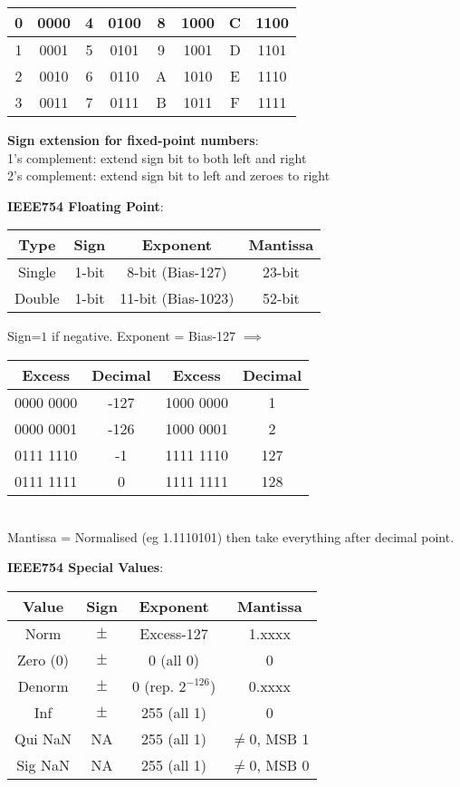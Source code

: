 \documentclass[a4paper,landscape]{article}
\newcommand{\rnname}[1]{\textbf{#1}}
\begin{document}
\begin{multicols*}{4}
\begin{flatitemize}
\begin{tabular}{|c|c|c|c|c|c|c|c|}
0 & 0000 & 4 & 0100 & 8 & 1000 & C & 1100 \\ \hline
1 & 0001 & 5 & 0101 & 9 & 1001 & D & 1101 \\ \hline
2 & 0010 & 6 & 0110 & A & 1010 & E & 1110 \\ \hline
3 & 0011 & 7 & 0111 & B & 1011 & F & 1111 \\ \hline
\end{tabular}
\item \rnname{Sign extension for fixed-point numbers}: \\
1's complement: extend sign bit to both left and right \\
2's complement: extend sign bit to left and zeroes to right
\item \rnname{IEEE754 Floating Point}: 
\begin{tabular}{ | c | c | c | c | } \hline
Type & Sign & Exponent & Mantissa \\ \hline
Single & 1-bit & 8-bit (Bias-127) & 23-bit \\ \hline
Double & 1-bit & 11-bit (Bias-1023) & 52-bit \\ \hline
\end{tabular}
Sign=$1$ if negative. Exponent = Bias-127 $\implies$ \\
\begin{tabular}{| c | c | c | c |} \hline
Excess & Decimal & Excess & Decimal \\ \hline
0000 0000 & -127 & 1000 0000 & 1 \\ \hline
0000 0001 & -126 & 1000 0001 & 2 \\ \hline
0111 1110 & -1   & 1111 1110 & 127 \\ \hline
0111 1111 & 0    & 1111 1111 & 128 \\ \hline
\end{tabular} \\
Mantissa = Normalised (eg 1.1110101) then take everything after decimal point. 
\item \rnname{IEEE754 Special Values}:
\begin{tabular}{ | c | c | c | c | } \hline
Value & Sign & Exponent & Mantissa \\ \hline
Norm & $\pm$ & Excess-127 & 1.xxxx \\ \hline
Zero (0) & $\pm$ & 0 (all 0) & 0 \\ \hline
Denorm & $\pm$ & 0 (rep. $2^{-126}$) & 0.xxxx \\ \hline
Inf & $\pm$ & 255 (all 1) & 0 \\ \hline
Qui NaN & NA & 255 (all 1) & $\neq 0$, MSB 1 \\ \hline
Sig NaN & NA & 255 (all 1) & $\neq 0$, MSB 0 \\ \hline
\end{tabular}


\end{flatitemize}
\end{multicols*}
\end{document}
